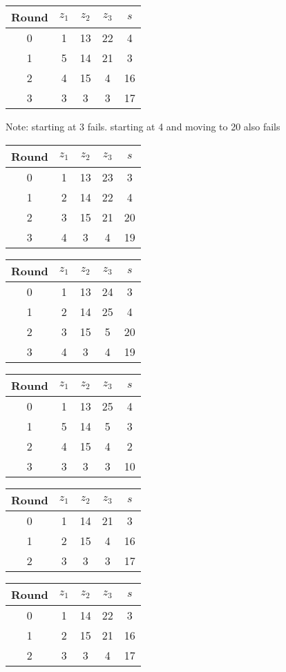\begin{tabular}{c | c | c | c | c }
Round & $z_1$ & $z_2$ & $z_3$ & $s$ \\
\hline
0 & 1 & 13 & 22 & 4 \\
1 & 5 & 14 & 21 & 3 \\
2 & 4 & 15 & 4 & 16 \\
3 & 3 & 3 & 3 & 17
\end{tabular}
Note: starting at 3 fails. starting at 4 and moving to 20 also fails

\begin{tabular}{c | c | c | c | c }
Round & $z_1$ & $z_2$ & $z_3$ & $s$ \\
\hline
0 & 1 & 13 & 23 & 3 \\
1 & 2 & 14 & 22 & 4 \\
2 & 3 & 15 & 21 & 20 \\
3 & 4 & 3 & 4 & 19
\end{tabular}

\begin{tabular}{c | c | c | c | c }
Round & $z_1$ & $z_2$ & $z_3$ & $s$ \\
\hline
0 & 1 & 13 & 24 & 3 \\
1 & 2 & 14 & 25 & 4 \\
2 & 3 & 15 & 5 & 20 \\
3 & 4 & 3 & 4 & 19
\end{tabular}

\begin{tabular}{c | c | c | c | c }
Round & $z_1$ & $z_2$ & $z_3$ & $s$ \\
\hline
0 & 1 & 13 & 25 & 4 \\
1 & 5 & 14 & 5 & 3 \\
2 & 4 & 15 & 4 & 2 \\
3 & 3 & 3 & 3 & 10
\end{tabular}

\begin{tabular}{c | c | c | c | c }
Round & $z_1$ & $z_2$ & $z_3$ & $s$ \\
\hline
0 & 1 & 14 & 21 & 3 \\
1 & 2 & 15 & 4 & 16 \\
2 & 3 & 3 & 3 & 17
\end{tabular}

\begin{tabular}{c | c | c | c | c }
Round & $z_1$ & $z_2$ & $z_3$ & $s$ \\
\hline
0 & 1 & 14 & 22 & 3 \\
1 & 2 & 15 & 21 & 16 \\
2 & 3 & 3 & 4 & 17
\end{tabular}

